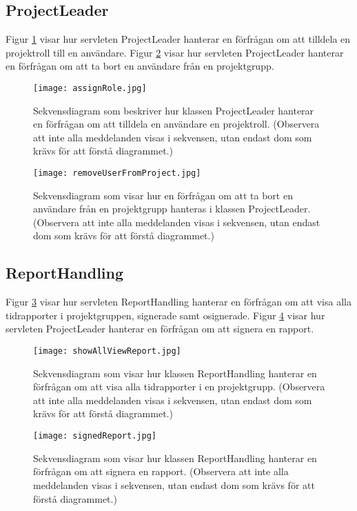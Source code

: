 \documentclass[a4paper]{article}
\begin{document}
\subsection{ProjectLeader}
Figur \ref{assignRole} visar hur servleten ProjectLeader hanterar en förfrågan om att tilldela en projektroll till en användare. Figur \ref{removeUserFromProject} visar hur servleten ProjectLeader hanterar en förfrågan om att ta bort en användare från en projektgrupp. 

\begin{figure}[h!]
\centering
\texttt{[image: assignRole.jpg]}
\caption{Sekvensdiagram som beskriver hur klassen ProjectLeader hanterar en förfrågan om att tilldela en användare en projektroll. (Observera att inte alla meddelanden visas i sekvensen, utan endast dom som krävs för att förstå diagrammet.) \label{assignRole}}
\end{figure}

\begin{figure}[h!]
\centering
\texttt{[image: removeUserFromProject.jpg]}
\caption{Sekvensdiagram som visar hur en förfrågan om att ta bort en användare från en projektgrupp hanteras i klassen ProjectLeader.(Observera att inte alla meddelanden visas i sekvensen, utan endast dom som krävs för att förstå diagrammet.) \label{removeUserFromProject}}
\end{figure}

\subsection{ReportHandling}

Figur \ref{showAllViewReport} visar hur servleten ReportHandling hanterar en förfrågan om att visa alla tidrapporter i projektgruppen, signerade samt osignerade. Figur \ref{signedReport} visar hur servleten ProjectLeader hanterar en förfrågan om att signera en rapport.

\begin{figure}[h!]
\centering
\texttt{[image: showAllViewReport.jpg]}
\caption{Sekvensdiagram som visar hur klassen ReportHandling hanterar en förfrågan om att visa alla tidrapporter i en projektgrupp. (Observera att inte alla meddelanden visas i sekvensen, utan endast dom som krävs för att förstå diagrammet.) \label{showAllViewReport}}
\end{figure}

\begin{figure}[h!]
\centering
\texttt{[image: signedReport.jpg]}
\caption{Sekvensdiagram som visar hur klassen ReportHandling hanterar en förfrågan om att signera en rapport. (Observera att inte alla meddelanden visas i sekvensen, utan endast dom som krävs för att förstå diagrammet.) \label{signedReport}}
\end{figure}
\end{document}
